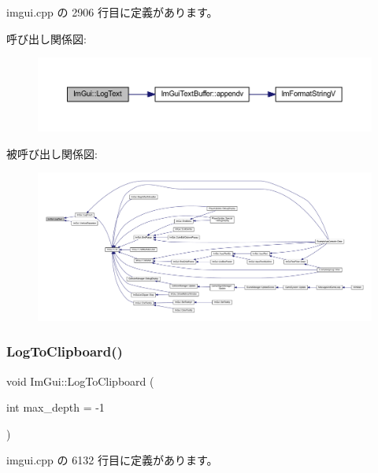  imgui.\+cpp の 2906 行目に定義があります。

呼び出し関係図\+:\nopagebreak
\begin{figure}[H]
\begin{center}
\leavevmode
\includegraphics[width=350pt]{namespace_im_gui_aa548475d8f771ab6524d73d900a41198_cgraph}
\end{center}
\end{figure}
被呼び出し関係図\+:
\nopagebreak
\begin{figure}[H]
\begin{center}
\leavevmode
\includegraphics[width=350pt]{namespace_im_gui_aa548475d8f771ab6524d73d900a41198_icgraph}
\end{center}
\end{figure}
\mbox{\label{namespace_im_gui_a81add991d176834b8a6e315dfc78e4f7}} 
\subsubsection{\texorpdfstring{Log\+To\+Clipboard()}{LogToClipboard()}}
{\footnotesize\ttfamily void Im\+Gui\+::\+Log\+To\+Clipboard (\begin{DoxyParamCaption}\item[{int}]{max\+\_\+depth = {\ttfamily -\/1} }\end{DoxyParamCaption})}



 imgui.\+cpp の 6132 行目に定義があります。

